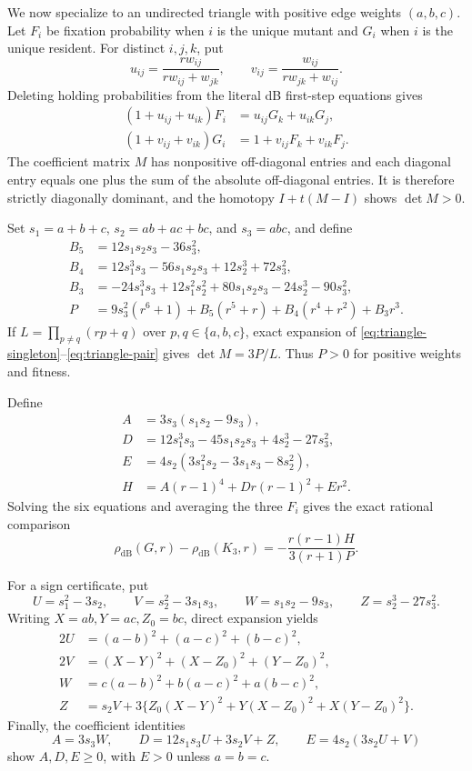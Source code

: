 \documentclass[11pt]{article}
\newcommand{\dB}{\mathrm{dB}}
\begin{document}
We now specialize to an undirected triangle with positive edge weights
$(a,b,c)$.  Let $F_i$ be fixation probability when $i$ is the unique mutant
and $G_i$ when $i$ is the unique resident.  For distinct $i,j,k$, put
\[
 u_{ij}=\frac{r w_{ij}}{r w_{ij}+w_{jk}},\qquad
 v_{ij}=\frac{w_{ij}}{r w_{jk}+w_{ij}}.
\]
Deleting holding probabilities from the literal dB first-step equations gives
\begin{align}
 (1+u_{ij}+u_{ik})F_i&=u_{ij}G_k+u_{ik}G_j,\label{eq:triangle-singleton}\\
 (1+v_{ij}+v_{ik})G_i&=1+v_{ij}F_k+v_{ik}F_j.\label{eq:triangle-pair}
\end{align}
The coefficient matrix $M$ has nonpositive off-diagonal entries and each
diagonal entry equals one plus the sum of the absolute off-diagonal entries.
It is therefore strictly diagonally dominant, and the homotopy
$I+t(M-I)$ shows $\det M>0$.

Set $s_1=a+b+c$, $s_2=ab+ac+bc$, and $s_3=abc$, and define
\begin{align*}
 B_5&=12s_1s_2s_3-36s_3^2,\\
 B_4&=12s_1^3s_3-56s_1s_2s_3+12s_2^3+72s_3^2,\\
 B_3&=-24s_1^3s_3+12s_1^2s_2^2+80s_1s_2s_3
       -24s_2^3-90s_3^2,\\
 P&=9s_3^2(r^6+1)+B_5(r^5+r)+B_4(r^4+r^2)+B_3r^3.
\end{align*}
If $L=\prod_{p\ne q}(r p+q)$ over $p,q\in\{a,b,c\}$, exact expansion of
\eqref{eq:triangle-singleton}--\eqref{eq:triangle-pair} gives
$\det M=3P/L$.  Thus $P>0$ for positive weights and fitness.

Define
\begin{align*}
 A&=3s_3(s_1s_2-9s_3),\\
 D&=12s_1^3s_3-45s_1s_2s_3+4s_2^3-27s_3^2,\\
 E&=4s_2(3s_1^2s_2-3s_1s_3-8s_2^2),\\
 H&=A(r-1)^4+Dr(r-1)^2+Er^2.
\end{align*}
Solving the six equations and averaging the three $F_i$ gives the exact
rational comparison
\begin{equation}\label{eq:triangle-difference}
 \rho_{\dB}(G,r)-\rho_{\dB}(K_3,r)
 =-\frac{r(r-1)H}{3(r+1)P}.
\end{equation}

For a sign certificate, put
\[
 U=s_1^2-3s_2,\qquad V=s_2^2-3s_1s_3,\qquad
 W=s_1s_2-9s_3,\qquad Z=s_2^3-27s_3^2.
\]
Writing $X=ab,Y=ac,Z_0=bc$, direct expansion yields
\begin{align*}
 2U&=(a-b)^2+(a-c)^2+(b-c)^2,\\
 2V&=(X-Y)^2+(X-Z_0)^2+(Y-Z_0)^2,\\
 W&=c(a-b)^2+b(a-c)^2+a(b-c)^2,\\
 Z&=s_2V+3\{Z_0(X-Y)^2+Y(X-Z_0)^2+X(Y-Z_0)^2\}.
\end{align*}
Finally, the coefficient identities
\[
 A=3s_3W,\qquad D=12s_1s_3U+3s_2V+Z,\qquad
 E=4s_2(3s_2U+V)
\]
show $A,D,E\ge0$, with $E>0$ unless $a=b=c$.
\end{document}
